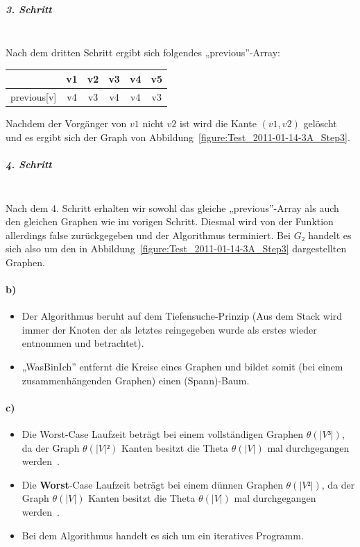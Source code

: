 \documentclass[a4paper, 12pt]{article}
\begin{document}
\subparagraph{3. Schritt}~\\

Nach dem dritten Schritt ergibt sich folgendes „previous”-Array:

\begin{center}
	\begin{tabular}{lccccc}
					& v1	& v2	& v3	& v4	& v5\\
		\hline
		previous[v] & v4	& v3	& v4	& v4	& v3\\
	\end{tabular}
\end{center}

Nachdem der Vorgänger von $v1$ nicht $v2$ ist wird die Kante $(v1,v2)$ gelöscht und es ergibt sich der Graph von Abbildung~\ref{figure:Test_2011-01-14-3A_Step3}.

\subparagraph{4. Schritt}~\\

Nach dem 4. Schritt erhalten wir sowohl das gleiche „previous”-Array als auch den gleichen Graphen wie im vorigen Schritt. Diesmal wird von der Funktion allerdings false zurückgegeben und der Algorithmus terminiert. Bei $G₂$ handelt es sich also um den in Abbildung~\ref{figure:Test_2011-01-14-3A_Step3} dargestellten Graphen.

\paragraph{b)}

\begin{itemize}
	\item Der Algorithmus beruht auf dem Tiefensuche-Prinzip (Aus dem Stack wird immer der Knoten der als letztes reingegeben wurde als erstes wieder entnommen und betrachtet).
	\item „WasBinIch” entfernt die Kreise eines Graphen und bildet somit (bei einem zusammenhängenden Graphen) einen (Spann)-Baum.
\end{itemize}

\paragraph{c)}

\begin{itemize}
	\item Die Worst-Case Laufzeit beträgt bei einem vollständigen Graphen $θ\left(|V³|\right)$, da der Graph $θ\left(|V|²\right)$ Kanten besitzt die Theta $θ\left(|V|\right)$ mal durchgegangen werden~\cite{Juggl3r_Beispiel3}.
	\item Die \textbf{Worst}-Case Laufzeit beträgt bei einem dünnen Graphen $θ\left(|V²|\right)$, da der Graph $θ\left(|V|\right)$ Kanten besitzt die Theta $θ\left(|V|\right)$ mal durchgegangen werden~\cite{Juggl3r_Beispiel3}.
	\item Bei dem Algorithmus handelt es sich um ein iteratives Programm. 
\end{itemize}
\end{document}
